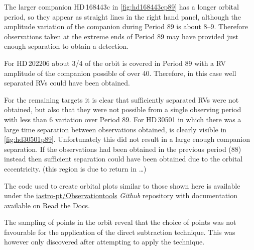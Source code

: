 The larger companion {HD\,168443}c in \cref{fig:hd168443cp89} has a longer orbital period, so they appear as straight lines in the right hand panel, although the amplitude variation of the companion during Period 89 is about 8--9\kmps.
Therefore observations taken at the extreme ends of Period 89 may have provided just enough separation to obtain a detection.

For HD\,202206 about 3/4 of the orbit is covered in Period 89 with a RV amplitude of the companion possible of over 40\kmps{}.
Therefore, in this case well separated RVs could have been obtained.

For the remaining targets it is clear that sufficiently separated RVs were not obtained, but also that they were not possible from a single observing period with less than 6\kmps{} variation over Period 89.
For HD\,30501 in which there was a large time separation between observations obtained, is clearly visible in \cref{fig:hd30501p89}.
Unfortunately this did not result in a large enough companion separation.
If the observations had been obtained in the previous period (88) instead then sufficient separation could have been obtained due to the orbital eccentricity. 
{\red{} (this region is due to return in \ldots)}

The code used to create orbital plots similar to those shown here is available under the \href{https://github.com/iastro-pt/ObservationTools}{iastro-pt/Observationtools} \emph{Github} repository with documentation available on \href{https://ia-observationtools.readthedocs.io/en/latest/rv.html}{Read the Docs}.


The sampling of points in the orbit reveal that the choice of points was not favourable for the application of the direct subtraction technique.
This was however only discovered after attempting to apply the technique.





